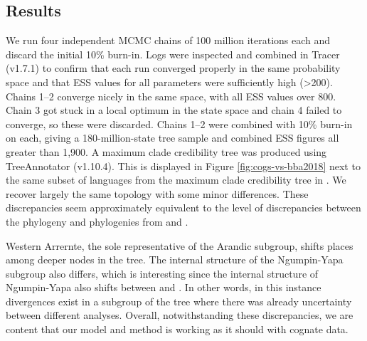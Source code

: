 \hypertarget{results-prelim-2}{%
\subsection{Results}\label{results-prelim-2}}

We run four independent MCMC chains of 100 million iterations each and discard the initial 10\% burn-in. Logs were inspected and combined in Tracer (v1.7.1) to confirm that each run converged properly in the same probability space and that ESS values for all parameters were sufficiently high (\textgreater{}200). Chains 1--2 converge nicely in the same space, with all ESS values over 800. Chain 3 got stuck in a local optimum in the state space and chain 4 failed to converge, so these were discarded. Chains 1--2 were combined with 10\% burn-in on each, giving a 180-million-state tree sample and combined ESS figures all greater than 1,900. A maximum clade credibility tree was produced using TreeAnnotator (v1.10.4). This is displayed in Figure \ref{fig:cogs-vs-bba2018} next to the same subset of languages from the maximum clade credibility tree in \textcite{bouckaert_origin_2018}. We recover largely the same topology with some minor differences. These discrepancies seem approximately equivalent to the level of discrepancies between the \textcite{bouckaert_origin_2018} phylogeny and phylogenies from \textcite{bowern_computational_2012} and \textcite{macklin-cordes_phylogenetic_2020}.

Western Arrernte, the sole representative of the Arandic subgroup, shifts places among deeper nodes in the tree. The internal structure of the Ngumpin-Yapa subgroup also differs, which is interesting since the internal structure of Ngumpin-Yapa also shifts between \textcite{bowern_computational_2012} and \textcite{bouckaert_origin_2018}. In other words, in this instance divergences exist in a subgroup of the tree where there was already uncertainty between different analyses. Overall, notwithstanding these discrepancies, we are content that our model and method is working as it should with cognate data.

